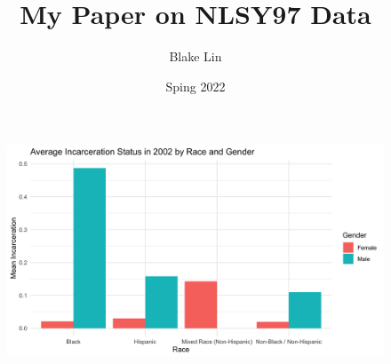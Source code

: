 \documentclass{article}
\author{Blake Lin}
\title{My Paper on NLSY97 Data}
\date{Sping 2022}
\begin{document}
\maketitle


\begin{figure}[H]
    \begin{center}
        \includegraphics[width=.85\textwidth]{incarc_by_racegender}
    \end{center}
    \label{fig:graph}
\end{figure}





\end{document}
